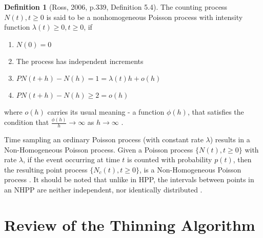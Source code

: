 \documentclass[%
 reprint,
 amsmath,amssymb,
 aps,
]{revtex4-2}
\theoremstyle{definition}
\newtheorem{definition}{Definition}[section]
\begin{document}
\begin{definition}[Ross, 2006, p.339, Definition 5.4] \cite{Ross_2006} The counting process ${N(t), t \ge 0}$ is said to be a nonhomogeneous Poisson process with intensity function $\lambda(t) \ge 0, t \ge 0$, if
\begin{enumerate}
\item $N(0) = 0$
\item The process has independent increments
\item $P{N(t + h) - N(h) = 1} = \lambda(t)h + o(h)$
\item $P{N(t + h) - N(h) \ge 2} = o(h)$
\end{enumerate}
where $o(h)$ carries its usual meaning - a function $\phi(h)$, that satisfies the condition that $\frac{\phi(h)}{h}\to\infty$ as $h\to\infty$ \cite{billingsley_1995}.
\end{definition}

Time sampling an ordinary Poisson process (with constant rate $\lambda$) results in a Non-Homogeneous Poisson process. Given a Poisson process $\{N(t), t \ge 0\}$ with rate $\lambda$, if the event occurring at time $t$ is counted with probability $p(t)$, then the resulting point process $\{N_c(t) , t\ge 0\}$, is a Non-Homogeneous Poisson process \cite{Ross_2006}. It should be noted that unlike in HPP, the intervals between points in an NHPP are neither independent, nor identically distributed \cite{lewis_shedler_1979}.

\section{\label{q:2}Review of the Thinning Algorithm}
\end{document}
